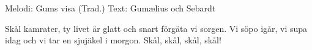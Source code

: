 \begin{song}

\begin{songmeta}
Melodi: Gums visa (Trad.)
Text: Gumælius och Sebardt
\end{songmeta}

\begin{songtext}
Skål kamrater, ty livet är glatt
och snart förgäta vi sorgen.
Vi söpo igår, vi supa idag
och vi tar en sjujäkel i morgon.
Skål, skål, skål, skål!
\end{songtext}

\begin{songnotes}
\end{songnotes}

\end{song}

